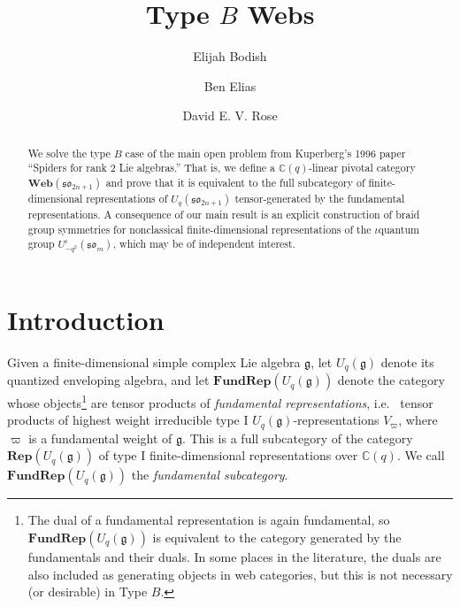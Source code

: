 \documentclass[10pt]{amsart}
\numberwithin{equation}{section}
\theoremstyle{definition}
\def\C{{\mathbb C}}
\newcommand{\son}[1][2n+1]{\mathfrak{so}_{#1}}
\newcommand{\som}[1][m]{\mathfrak{so}_{#1}}
\newcommand{\Rep}{\mathbf{Rep}}
\newcommand{\FRep}{\mathbf{FundRep}}
\newcommand{\Web}{\mathbf{Web}}
\newcommand{\iqUsom}[1][m]{{U}^{\iota}_{-q^2}(\som[#1])}
\begin{document}
%


\title[]{Type $B$ Webs}

\author{Elijah Bodish}
\address{Department of Mathematics, Indiana University Bloomington, 
Rawles Hall, Bloomington, IN 47405-7106, USA}

\author{Ben Elias}
\address{Department of Mathematics, University of Oregon,
Fenton Hall, Eugene, OR 97403-1222, USA}

\author{David E. V. Rose}
\address{Department of Mathematics, University of North Carolina, 
Phillips Hall CB \#3250, UNC-CH, Chapel Hill, NC 27599-3250, USA}

\begin{abstract}
We solve the type $B$ case of the main open problem from Kuperberg's 1996 paper ``Spiders for rank 2 Lie algebras.''
That is, we define a $\C(q)$-linear pivotal category $\Web(\son)$ and prove that it 
is equivalent to the full subcategory of finite-dimensional representations of 
$U_q(\son)$ tensor-generated by the fundamental representations. 
A consequence of our main result is an explicit construction 
of braid group symmetries for nonclassical finite-dimensional representations of the 
$\iota$quantum group $\iqUsom$, 
which may be of independent interest.
\end{abstract}

\maketitle

\setcounter{tocdepth}{1}
\tableofcontents

%
\section{Introduction}
%

Given a finite-dimensional simple complex Lie algebra $\mathfrak{g}$, 
let $U_q(\mathfrak{g})$ denote its quantized enveloping algebra,
and let $\FRep(U_q(\mathfrak{g}))$ denote the category whose 
objects\footnote{The dual of a fundamental representation is again fundamental,
so $\FRep(U_q(\mathfrak{g}))$ is equivalent to the category generated by the fundamentals 
and their duals. In some places in the literature, the duals are also included as generating objects in 
web categories, but this is not necessary (or desirable) in Type $B$.} 
are tensor products of \emph{fundamental representations}, i.e.~ tensor products of highest weight irreducible type I  
$U_q(\mathfrak{g})$-representations $V_{\varpi}$, where $\varpi$ is a fundamental weight of $\mathfrak{g}$. 
This is a full subcategory of the category $\Rep(U_q(\mathfrak{g}))$ of type I finite-dimensional 
representations over $\C(q)$. We call $\FRep(U_q(\mathfrak{g}))$ the \emph{fundamental subcategory}. 
\end{document}
